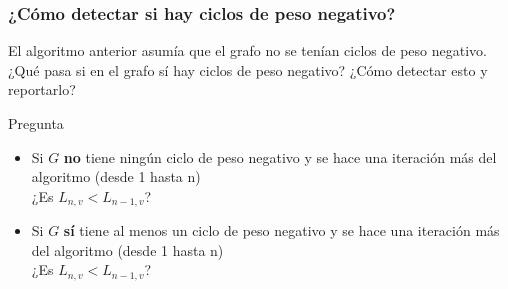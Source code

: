 \documentclass{beamer}
\begin{document}
	
	\begin{frame}
		\frametitle{¿Cómo detectar si hay ciclos de peso negativo?}
		El algoritmo anterior asumía que el grafo no se tenían ciclos de peso negativo. ¿Qué pasa si en el grafo sí hay ciclos de peso negativo? ¿Cómo detectar esto y reportarlo?
		\begin{alertblock}{Pregunta}
			\begin{itemize}
				\item Si $G$ \textbf{no} tiene ningún ciclo de peso negativo y se hace una iteración más del algoritmo (desde 1 hasta n) \\¿Es $L_{n, v} < L_{n-1, v}$?
				\item Si $G$ \textbf{sí} tiene al menos un ciclo de peso negativo y se hace una iteración más del algoritmo (desde 1 hasta n) \\¿Es $L_{n, v} < L_{n-1, v}$?
			\end{itemize}
		\end{alertblock}
	\end{frame}
	
\end{document}
